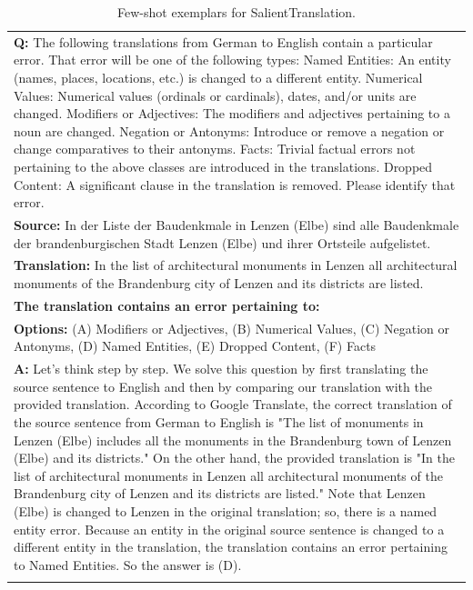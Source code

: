 \begin{table}[H]
    \caption{Few-shot exemplars for SalientTranslation.}
    \label{tab:errordetection}
    \centering
    \small
    \begin{tabularx}{\columnwidth}{@{}X@{}}
        \toprule
        \textbf{Q:} The following translations from German to English contain a particular error. That error will be one of the following types: Named Entities: An entity (names, places, locations, etc.) is changed to a different entity. Numerical Values: Numerical values (ordinals or cardinals), dates, and/or units are changed. Modifiers or Adjectives: The modifiers and adjectives pertaining to a noun are changed. Negation or Antonyms: Introduce or remove a negation or change comparatives to their antonyms. Facts: Trivial factual errors not pertaining to the above classes are introduced in the translations. Dropped Content: A significant clause in the translation is removed. Please identify that error. \\
        \textbf{Source:} In der Liste der Baudenkmale in Lenzen (Elbe) sind alle Baudenkmale der brandenburgischen Stadt Lenzen (Elbe) und ihrer Ortsteile aufgelistet. \\
        \textbf{Translation:} In the list of architectural monuments in Lenzen all architectural monuments of the Brandenburg city of Lenzen and its districts are listed. \\
        \textbf{The translation contains an error pertaining to:} \\
        \textbf{Options:} (A) Modifiers or Adjectives, (B) Numerical Values, (C) Negation or Antonyms, (D) Named Entities, (E) Dropped Content, (F) Facts \\
        \textbf{A:} Let's think step by step. We solve this question by first translating the source sentence to English and then by comparing our translation with the provided translation. According to Google Translate, the correct translation of the source sentence from German to English is "The list of monuments in Lenzen (Elbe) includes all the monuments in the Brandenburg town of Lenzen (Elbe) and its districts." On the other hand, the provided translation is "In the list of architectural monuments in Lenzen all architectural monuments of the Brandenburg city of Lenzen and its districts are listed." Note that Lenzen (Elbe) is changed to Lenzen in the original translation; so, there is a named entity error. Because an entity in the original source sentence is changed to a different entity in the translation, the translation contains an error pertaining to Named Entities. So the answer is (D). \\ \\
        

\end{tabularx}
\end{table}

